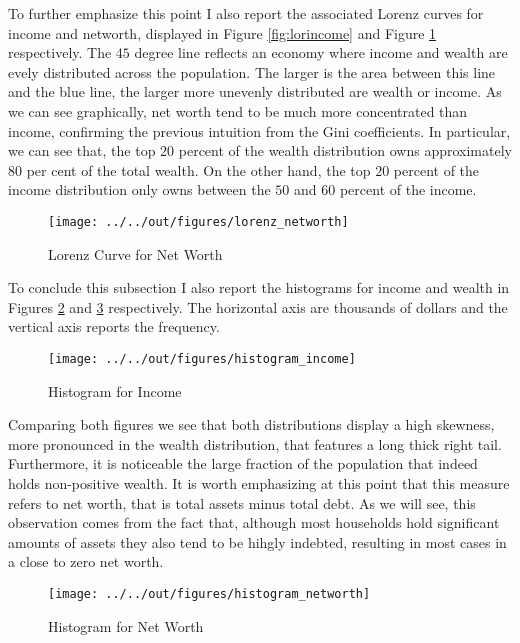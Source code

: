 \documentclass[11pt, a4paper, leqno]{article}
\begin{document}
To further emphasize this point I also report the associated Lorenz curves for income and networth, displayed in Figure \ref*{fig:lorincome} and Figure \ref*{fig:lornetworth} respectively. The $45$ degree line reflects an economy where income and wealth are evely distributed across the population. The larger is the area between this line and the blue line, the larger more unevenly distributed are wealth or income. As we can see graphically, net worth tend to be much more concentrated than income, confirming the previous intuition from the Gini coefficients. In particular, we can see that, the top $20$ percent of the wealth distribution owns approximately $80$ per cent of the total wealth. On the other hand, the top $20$ percent of the income distribution only owns between the $50$ and $60$ percent of the income. 


\begin{figure}[H]
    \caption{Lorenz Curve for Net Worth}
    
    \texttt{[image: ../../out/figures/lorenz\_networth]}
    \label{fig:lornetworth}

\end{figure}

To conclude this subsection I also report the histograms for income and wealth in Figures \ref*{fig:histincome} and \ref*{fig:histnetworth} respectively. The horizontal axis are thousands of dollars and the vertical axis reports the frequency. 

\begin{figure}[h]
    \caption{Histogram for Income}
    
    \texttt{[image: ../../out/figures/histogram\_income]}
    \label{fig:histincome}
\end{figure}

Comparing both figures we see that both distributions display a high skewness, more pronounced in the wealth distribution, that features a long thick right tail. Furthermore, it is noticeable the large fraction of the population that indeed holds non-positive wealth. It is worth emphasizing at this point that this measure refers to net worth, that is total assets minus total debt. As we will see, this observation comes from the fact that, although most households hold significant amounts of assets they also tend to be hihgly indebted, resulting in most cases in a close to zero net worth.

\begin{figure}[h]
    \caption{Histogram for Net Worth}
    
    \texttt{[image: ../../out/figures/histogram\_networth]}
    \label{fig:histnetworth}
\end{figure}
\end{document}
